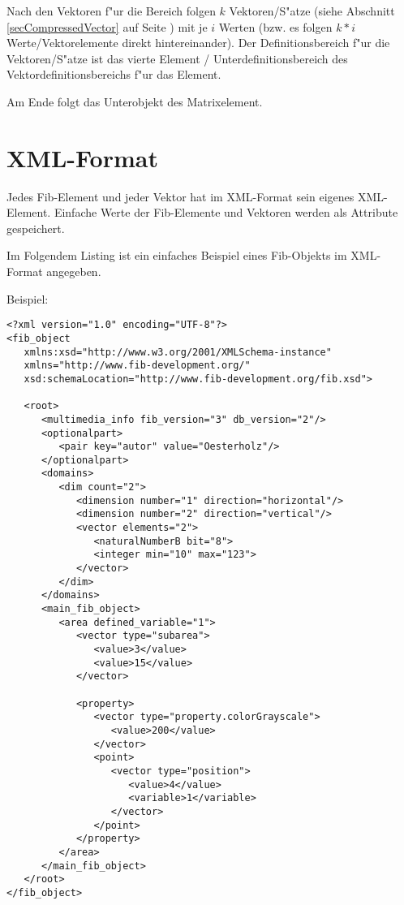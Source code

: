 Nach den Vektoren f"ur die Bereich folgen $k$ Vektoren/S"atze (siehe Abschnitt \ref{secCompressedVector} auf Seite \pageref{secCompressedVector}) mit je $i$ Werten (bzw. es folgen $k * i$ Werte/Vektorelemente direkt hintereinander). Der Definitionsbereich f"ur die Vektoren/S"atze ist das vierte Element / Unterdefinitionsbereich des Vektordefinitionsbereichs f"ur das Element.

Am Ende folgt das Unterobjekt des Matrixelement.






\section{XML-Format}
\label{xmlFormat}

Jedes Fib-Element und jeder Vektor hat im XML-Format sein eigenes XML-Element. Einfache Werte der Fib-Elemente und Vektoren werden als Attribute gespeichert.

Im Folgendem Listing ist ein einfaches Beispiel eines Fib-Objekts im XML-Format angegeben.

\bigskip\noindent
Beispiel:
\begin{verbatim}
<?xml version="1.0" encoding="UTF-8"?>
<fib_object
   xmlns:xsd="http://www.w3.org/2001/XMLSchema-instance"
   xmlns="http://www.fib-development.org/"
   xsd:schemaLocation="http://www.fib-development.org/fib.xsd">

   <root>
      <multimedia_info fib_version="3" db_version="2"/>
      <optionalpart>
         <pair key="autor" value="Oesterholz"/>
      </optionalpart>
      <domains>
         <dim count="2">
            <dimension number="1" direction="horizontal"/>
            <dimension number="2" direction="vertical"/>
            <vector elements="2">
               <naturalNumberB bit="8">
               <integer min="10" max="123">
            </vector>
         </dim>
      </domains>
      <main_fib_object>
         <area defined_variable="1">
            <vector type="subarea">
               <value>3</value>
               <value>15</value>
            </vector>

            <property>
               <vector type="property.colorGrayscale">
                  <value>200</value>
               </vector>
               <point>
                  <vector type="position">
                     <value>4</value>
                     <variable>1</variable>
                  </vector>
               </point>
            </property>
         </area>
      </main_fib_object>
   </root>
</fib_object>
\end{verbatim}



